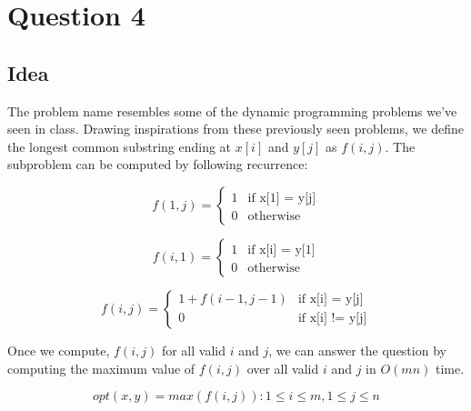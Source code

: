 \documentclass{article}
\begin{document}
    \section*{Question 4}

    \subsection*{Idea}
    The problem name resembles some of the dynamic programming problems we've seen in class. Drawing inspirations from these previously seen problems, we define the longest common substring ending at $x[i]$ and $y[j]$ as $f(i, j)$. The subproblem can be computed by following recurrence:

    \begin{equation*}
        f(1, j) = 
        \begin{cases}
            1   & \text{if x[1] = y[j]} \\
            0   & \text{otherwise}
        \end{cases}
    \end{equation*}

    \begin{equation*}
        f(i, 1) = 
        \begin{cases}
            1   & \text{if x[i] = y[1]} \\
            0   & \text{otherwise}
        \end{cases}
    \end{equation*}

    \begin{equation*}
        f(i, j) = 
        \begin{cases}
            1 + f(i-1, j-1)  & \text{if x[i] = y[j]} \\
            0                & \text{if x[i] != y[j]}
        \end{cases}
    \end{equation*}

    Once we compute, $f(i, j)$ for all valid $i$ and $j$, we can answer the question by computing the maximum value of $f(i, j)$ over all valid $i$ and $j$ in $O(mn)$ time.

    \begin{equation*}
        opt(x, y) = max(f(i, j)) : 1 \le i \le m, 1 \le j \le n
    \end{equation*}
    
\end{document}
